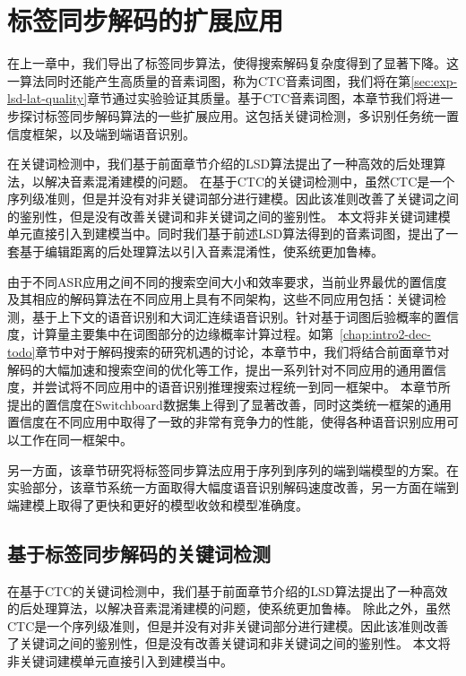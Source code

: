 
\chapter{标签同步解码的扩展应用}
\label{chap:lsd-apply}

在上一章中，我们导出了标签同步算法，使得搜索解码复杂度得到了显著下降。这一算法同时还能产生高质量的音素词图，称为CTC音素词图，我们将在第\ref{sec:exp-lsd-lat-quality}章节通过实验验证其质量。基于CTC音素词图，本章节我们将进一步探讨标签同步解码算法的一些扩展应用。这包括关键词检测，多识别任务统一置信度框架，以及端到端语音识别。

在关键词检测中，我们基于前面章节介绍的LSD算法提出了一种高效的后处理算法，以解决音素混淆建模的问题。
在基于CTC的关键词检测中，虽然CTC是一个序列级准则，但是并没有对非关键词部分进行建模。因此该准则改善了关键词之间的鉴别性，但是没有改善关键词和非关键词之间的鉴别性。
本文将非关键词建模单元直接引入到建模当中。同时我们基于前述LSD算法得到的音素词图，提出了一套基于编辑距离的后处理算法以引入音素混淆性，使系统更加鲁棒。

由于不同ASR应用之间不同的搜索空间大小和效率要求，当前业界最优的置信度及其相应的解码算法在不同应用上具有不同架构，这些不同应用包括：关键词检测，基于上下文的语音识别和大词汇连续语音识别。针对基于词图后验概率的置信度，计算量主要集中在词图部分的边缘概率计算过程。如第~\ref{chap:intro2-dec-todo}章节中对于解码搜索的研究机遇的讨论，本章节中，我们将结合前面章节对解码的大幅加速和搜索空间的优化等工作，提出一系列针对不同应用的通用置信度，并尝试将不同应用中的语音识别推理搜索过程统一到同一框架中。
本章节所提出的置信度在Switchboard数据集上得到了显著改善，同时这类统一框架的通用置信度在不同应用中取得了一致的非常有竞争力的性能，使得各种语音识别应用可以工作在同一框架中。

另一方面，该章节研究将标签同步算法应用于序列到序列的端到端模型的方案。在实验部分，该章节系统一方面取得大幅度语音识别解码速度改善，另一方面在端到端建模上取得了更快和更好的模型收敛和模型准确度。


\section{基于标签同步解码的关键词检测}
\label{Sec:kws-ctc}


在基于CTC的关键词检测中，我们基于前面章节介绍的LSD算法提出了一种高效的后处理算法，以解决音素混淆建模的问题，使系统更加鲁棒。
除此之外，虽然CTC是一个序列级准则，但是并没有对非关键词部分进行建模。因此该准则改善了关键词之间的鉴别性，但是没有改善关键词和非关键词之间的鉴别性。
本文将非关键词建模单元直接引入到建模当中。

